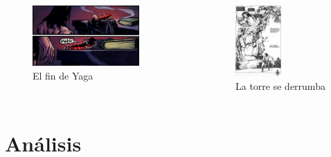 \begin{frame}{}
\begin{columns}
    \begin{figure}[htb]
    \centering
        \includegraphics[width=0.8\textwidth]{img/res/21}
        \caption{El fin de Yaga}
    \end{figure}    
    \begin{figure}[htb]
    \centering
        \includegraphics[width=0.5\textwidth]{img/res/22}
        \caption{La torre se derrumba}
    \end{figure}    
\end{columns}
\end{frame}

\section{Análisis}
